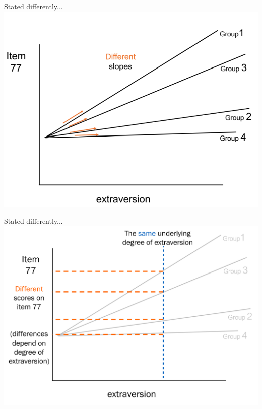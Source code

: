 \documentclass[10pt]{beamer}\usepackage[]{graphicx}\usepackage[]{xcolor}
\begin{document}
\begin{frame}{Stated differently...}
    \includegraphics[height=0.8\textheight,keepaspectratio]{images/slide112.png}
\end{frame}

\begin{frame}{Stated differently...}
    \includegraphics[height=0.8\textheight,keepaspectratio]{images/slide113.png}
\end{frame}
\end{document}
